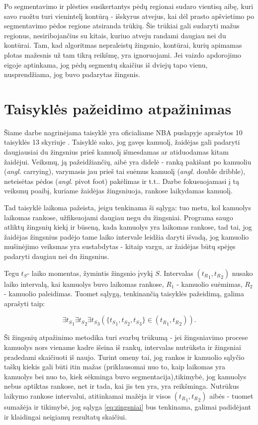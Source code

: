 \documentclass{VUMIFPSkursinis}
\begin{document}
 Po segmentavimo ir plėsties susikertantys pėdų regionai sudaro vientisą aibę, kuri savo ruožtu turi vienintelį kontūrą - išskyrus atvejus, kai dėl prasto apšvietimo po segmentavimo pėdos regione atsiranda trūkių. Šie trūkiai gali sudaryti mažus regionus, nesiribojančius su kitais, kuriuo atveju randami daugiau nei du kontūrai. Tam, kad algoritmas nepraleistų žingsnio, kontūrai, kurių apimamas plotas mažesnis už tam tikrą reikšmę, yra ignoruojami. Jei vaizdo apdorojimo eigoje aptinkama, jog pėdų segmentų skaičius iš dviejų tapo vienu, nusprendžiama, jog buvo padarytas žingsnis. 

\section{Taisyklės pažeidimo atpažinimas}
Šiame darbe nagrinėjama taisyklė yra oficialiame NBA puslapyje aprašytos 10 taisyklės 13 skyriuje \cite{NBARules}. Taisyklė sako, jog gavęs kamuolį, žaidėjas gali padaryti daugiausiai du žingsnius prieš kamuolį išmesdamas ar atiduodamas kitam žaidėjui. Veiksmų, ją pažeidžiančių, aibė yra didelė - ranką pakišant po kamuoliu (\textit{angl.} carrying), varymasis jau prieš tai suėmus kamuolį (\textit{angl.} double dribble), neteisėtas pėdos (\textit {angl.} pivot foot) pakėlimas ir t.t.. Darbe fokusuojamasi į tą veiksmų poaibį, kuriame žaidėjas žingsniuoja, rankose laikydamas kamuolį. 

Tad taisyklė laikoma pažeista, jeigu tenkinama ši sąlyga:  tuo metu, kol kamuolys laikomas rankose, užfiksuojami daugiau negu du žingsniai. Programa saugo atliktų žingsnių kiekį ir būseną, kada kamuolys yra laikomas rankose, tad tai, jog žaidėjas žingsnius padėjo tame laiko intervale leidžia daryti išvadą, jog kamuolio mušinėjimo veiksmas yra sustabdytas - kitaip vargu, ar žaidėjas būtų spėjęs padaryti daugiau nei du žingsnius. 

Tegu $t_S$- laiko momentas, žymintis žingsnio įvykį $S$. Intervalas $({t_R}_1,{ t_R}_2)$ nusako laiko intervalą, kai kamuolys buvo laikomas rankose, $R_1$ - kamuolio suėmimas, $R_2$ - kamuolio paleidimas. Tuomet sąlygą, tenkinančią taisyklės pažeidimą, galima aprašyti taip: 

\begin{equation}\label{eq:zingsniai}
\exists {t_S}_1\exists {t_S}_2 \exists {t_S}_3 ( \{{t_S}_1,  {t_S}_2,  {t_S}_3\} \in	({t_R}_1, {t_R}_2) ).
\end{equation}

Ši žingsnių atpažinimo metodika turi svarbų trūkumą - jei žingsniavimo procese kamuolys nors viename kadre išeina iš rankų, intervalas nutrūksta ir žingsniai pradedami skaičiuoti iš naujo. Turint omeny tai, jog rankos ir kamuolio sąlyčio taškų kiekis gali būti itin mažas (priklausomai nuo to, kaip laikomas yra kamuolys bei nuo to, kiek sėkminga buvo segmentacija),tikimybė, jog kamuolys nebus aptiktas rankose, net ir tada, kai jis ten yra, yra reikšminga. Nutrūkus laikymo rankose intervalui, atitinkamai mažėja ir visos $({t_R}_1,{ t_R}_2)$ aibės - tuomet sumažėja ir tikimybė, jog sąlyga \ref{eq:zingsniai} bus tenkinama, galimai padidėjant ir klaidingai neigiamų rezultatų skaičiui.
\end{document}
